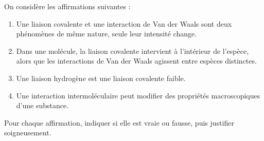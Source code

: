 \documentclass[11pt,a4paper]{article}
\begin{document}
\begin{enoncebox}
On considère les affirmations suivantes :
\begin{enumerate}[label=\alph*)]
    \item Une liaison covalente et une interaction de Van der Waals sont deux phénomènes de même nature, seule leur intensité change.
    \item Dans une molécule, la liaison covalente intervient à l'intérieur de l'espèce, alors que les interactions de Van der Waals agissent entre espèces distinctes.
    \item Une liaison hydrogène est une liaison covalente faible.
    \item Une interaction intermoléculaire peut modifier des propriétés macroscopiques d'une substance.
\end{enumerate}

Pour chaque affirmation, indiquer si elle est vraie ou fausse, puis justifier soigneusement.
\end{enoncebox}
\end{document}
